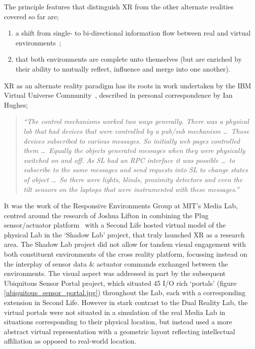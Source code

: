 The principle features that distinguish XR from the other alternate realities covered so far are;
\begin{enumerate}
	\item a shift from single- to bi-directional information flow between real and virtual environments~\cite{kim:practical};
	\item that both environments are complete unto themselves (but are enriched by their ability to mutually reflect, influence and merge into one another).~\cite{lifton:merging}
\end{enumerate}


XR as an alternate reality paradigm has its roots in work undertaken by the IBM Virtual Universe Community~\cite{Hughes2006, Hughes2006a,Hughes2006b}, described in personal correspondence by Ian Hughes;

\begin{quote}
\textit{``The control mechanisms worked two ways generally. There was a physical lab that had devices that were controlled by a pub/sub mechanism \ldots\ Those devices subscribed to various messages. So initially web pages controlled them \ldots\ Equally the objects generated messages when they were physically switched on and off. As SL\SLfootnote{} had an RPC interface it was possible \ldots\ to subscribe to the same messages and send requests into SL to change states of object \ldots\ So there were lights, blinds, proximity detectors and even the tilt sensors on the laptops that were instrumented with these messages.''}
\end{quote}

It was the work of the Responsive Environments Group at MIT's Media Lab, centred around the research of Joshua Lifton in combining the Plug sensor/actuator platform~\cite{Lifton2007b} with a Second Life hosted virtual model of the physical Lab in the `Shadow Lab' project, that truly launched XR as a research area. The Shadow Lab project did not allow for tandem visual engagement with both constituent environments of the cross reality platform, focussing instead on the interplay of sensor data \& actuator commands exchanged between the environments. The visual aspect was addressed in part by the subsequent Ubiquitous Sensor Portal project, which situated 45 I/O rich `portals' (figure \ref{ubiquitous_sensor_portal.jpg}) throughout the Lab, each with a corresponding extension in Second Life. However in stark contrast to the Dual Reality Lab, the virtual portals were not situated in a simulation of the real Media Lab in situations corresponding to their physical location, but instead used a more abstract virtual representation with a geometric layout reflecting intellectual affiliation as opposed to real-world location.

